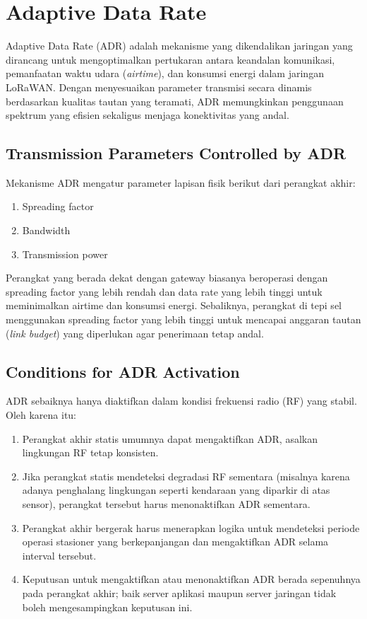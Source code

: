 \section{Adaptive Data Rate}
Adaptive Data Rate (ADR) adalah mekanisme yang dikendalikan jaringan yang dirancang untuk mengoptimalkan pertukaran antara keandalan komunikasi, pemanfaatan waktu udara (\emph{airtime}), dan konsumsi energi dalam jaringan LoRaWAN. Dengan menyesuaikan parameter transmisi secara dinamis berdasarkan kualitas tautan yang teramati, ADR memungkinkan penggunaan spektrum yang efisien sekaligus menjaga konektivitas yang andal.
\subsection{Transmission Parameters Controlled by ADR}
Mekanisme ADR mengatur parameter lapisan fisik berikut dari perangkat akhir:
\begin{enumerate}
    \item Spreading factor
    \item Bandwidth
    \item Transmission power
\end{enumerate}
Perangkat yang berada dekat dengan gateway biasanya beroperasi dengan spreading factor yang lebih rendah dan data rate yang lebih tinggi untuk meminimalkan airtime dan konsumsi energi. Sebaliknya, perangkat di tepi sel menggunakan spreading factor yang lebih tinggi untuk mencapai anggaran tautan (\emph{link budget}) yang diperlukan agar penerimaan tetap andal.
\subsection{Conditions for ADR Activation}
ADR sebaiknya hanya diaktifkan dalam kondisi frekuensi radio (RF) yang stabil. Oleh karena itu:
\begin{enumerate}
    \item Perangkat akhir statis umumnya dapat mengaktifkan ADR, asalkan lingkungan RF tetap konsisten.
    \item Jika perangkat statis mendeteksi degradasi RF sementara (misalnya karena adanya penghalang lingkungan seperti kendaraan yang diparkir di atas sensor), perangkat tersebut harus menonaktifkan ADR sementara.
    \item Perangkat akhir bergerak harus menerapkan logika untuk mendeteksi periode operasi stasioner yang berkepanjangan dan mengaktifkan ADR selama interval tersebut.
    \item Keputusan untuk mengaktifkan atau menonaktifkan ADR berada sepenuhnya pada perangkat akhir; baik server aplikasi maupun server jaringan tidak boleh mengesampingkan keputusan ini.
\end{enumerate}
